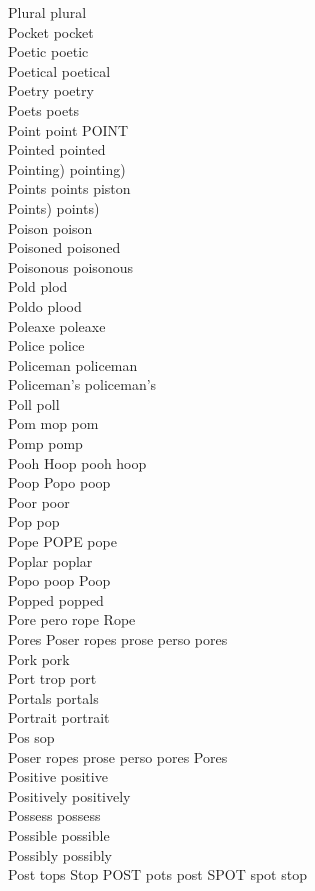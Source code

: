 Plural plural\\
Pocket pocket\\
Poetic poetic\\
Poetical poetical\\
Poetry poetry\\
Poets poets\\
Point point POINT\\
Pointed pointed\\
Pointing) pointing)\\
Points points piston\\
Points) points)\\
Poison poison\\
Poisoned poisoned\\
Poisonous poisonous\\
Pold plod\\
Poldo plood\\
Poleaxe poleaxe\\
Police police\\
Policeman policeman\\
Policeman's policeman's\\
Poll poll\\
Pom mop pom\\
Pomp pomp\\
Pooh Hoop pooh hoop\\
Poop Popo poop\\
Poor poor\\
Pop pop\\
Pope POPE pope\\
Poplar poplar\\
Popo poop Poop\\
Popped popped\\
Pore pero rope Rope\\
Pores Poser ropes prose perso pores\\
Pork pork\\
Port trop port\\
Portals portals\\
Portrait portrait\\
Pos sop\\
Poser ropes prose perso pores Pores\\
Positive positive\\
Positively positively\\
Possess possess\\
Possible possible\\
Possibly possibly\\
Post tops Stop POST pots post SPOT spot stop\\

